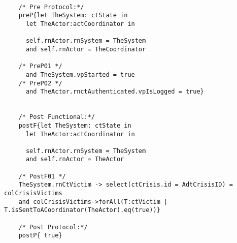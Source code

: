 	\scriptsize
	\vspace{0.5cm}
	\begin{lstlisting}[style=MessirStyle,firstnumber=auto,captionpos=b,caption={\msrmessir (MCL-oriented) specification of the operation \emph{oeGetVictimSet}.},label=OM-actCoordinator-oeGetVictimSet-MCL-LST]

	/* Pre Protocol:*/ 
	preP{let TheSystem: ctState in
	  let TheActor:actCoordinator in
	  
	  self.rnActor.rnSystem = TheSystem
	  and self.rnActor = TheCoordinator
	  
	/* PreP01 */
	  and TheSystem.vpStarted = true
	/* PreP02 */
	  and TheActor.rnctAuthenticated.vpIsLogged = true}
	
	
	/* Post Functional:*/ 
	postF{let TheSystem: ctState in
	  let TheActor:actCoordinator in
	  
	  self.rnActor.rnSystem = TheSystem
	  and self.rnActor = TheActor
	  
	/* PostF01 */
	TheSystem.rnCtVictim -> select(ctCrisis.id = AdtCrisisID) = colCrisisVictims
	and colCrisisVictims->forAll(T:ctVictim | T.isSentToACoordinator(TheActor).eq(true))}
	
	/* Post Protocol:*/ 
	postP{ true}
	
	\end{lstlisting}
	\normalsize 
	
	
	
	





